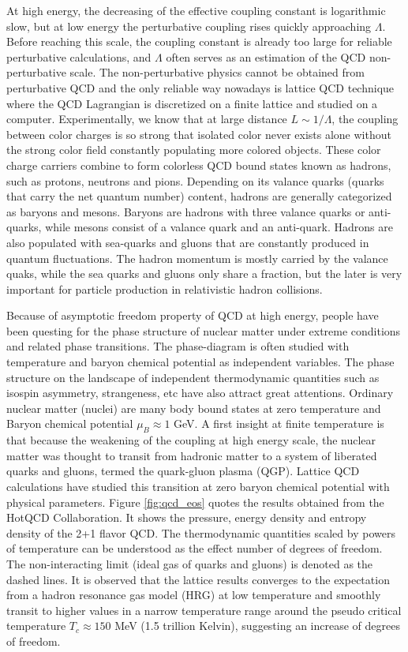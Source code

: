 At high energy, the decreasing of the effective coupling constant is logarithmic slow, but at low energy the perturbative coupling rises quickly approaching $\Lambda$.
Before reaching this scale, the coupling constant is already too large for reliable perturbative calculations, and $\Lambda$ often serves as an estimation of the QCD non-perturbative scale.
The non-perturbative physics cannot be obtained from perturbative QCD and the only reliable way nowadays is lattice QCD technique where the QCD Lagrangian is discretized on a finite lattice and studied on a computer.
Experimentally, we know that at large distance $L\sim 1/\Lambda$, the coupling between color charges is so strong that isolated color never exists alone without the strong color field constantly populating more colored objects.
These color charge carriers combine to form colorless QCD bound states known as hadrons, such as protons, neutrons and pions.
Depending on its valance quarks (quarks that carry the net quantum number) content, hadrons are generally categorized as baryons and mesons.
Baryons are hadrons with three valance quarks or anti-quarks, while mesons consist of a valance quark and an anti-quark.
Hadrons are also populated with sea-quarks and gluons that are constantly produced in quantum fluctuations.
The hadron momentum is mostly carried by the valance quaks, while the sea quarks and gluons only share a fraction, but the later is very important for particle production in relativistic hadron collisions.

Because of asymptotic freedom property of QCD at high energy, people have been questing for the phase structure of nuclear matter under extreme conditions and related phase transitions.
The phase-diagram is often studied with temperature and baryon chemical potential as independent variables. 
The phase structure on the landscape of independent thermodynamic quantities such as isospin asymmetry, strangeness, etc have also attract great attentions.
Ordinary nuclear matter (nuclei) are many body bound states at zero temperature and Baryon chemical potential $\mu_B\approx 1$ GeV.
A first insight at finite temperature is that because the weakening of the coupling at high energy scale, the nuclear matter was thought to transit from hadronic matter to a system of liberated quarks and gluons, termed the quark-gluon plasma (QGP). 
Lattice QCD calculations have studied this transition at zero baryon chemical potential with physical parameters.
Figure \ref{fig:qcd_eos} quotes the results obtained from the HotQCD Collaboration.
It shows the pressure, energy density and entropy density of the 2+1 flavor QCD.
The thermodynamic quantities scaled by powers of temperature can be understood as the effect number of degrees of freedom.
The non-interacting limit (ideal gas of quarks and gluons) is denoted as the dashed lines. 
It is observed that the lattice results converges to the expectation from a hadron resonance gas model (HRG) at low temperature and smoothly transit to higher values in a narrow temperature range around the pseudo critical temperature $T_c \approx 150 $ MeV (1.5 trillion Kelvin), suggesting an increase of degrees of freedom.

